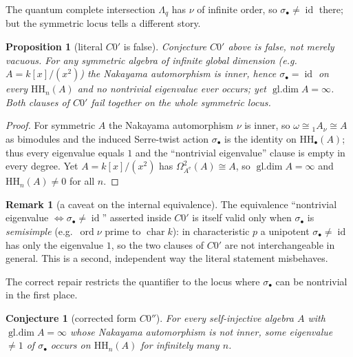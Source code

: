 \documentclass[11pt]{amsart}
\newtheorem{proposition}[theorem]{Proposition}
\newtheorem{conjecture}[theorem]{Conjecture}
\theoremstyle{definition}
\newtheorem{remark}[theorem]{Remark}
\newcommand{\HH}{\mathrm{HH}}
\newcommand{\gl}{\operatorname{gl.dim}}
\newcommand{\id}{\operatorname{id}}
\newcommand{\Ae}{A^{\mathrm{e}}}
\newcommand{\kk}{k}
\begin{document}
The quantum complete intersection $\Lambda_q$ has $\nu$ of infinite order, so
$\sigma_\bullet\ne\id$ there; but the symmetric locus tells a different story.

\begin{proposition}[literal $C0'$ is false]\label{prop:c0false}
Conjecture $C0'$ above is \emph{false}, not merely vacuous. For any
\emph{symmetric} algebra of infinite global dimension (e.g.\
$A=\kk[x]/(x^2)$) the Nakayama automorphism is inner, hence
$\sigma_\bullet=\id$ on every $\HH_n(A)$ and no nontrivial eigenvalue ever
occurs; yet $\gl A=\infty$. Both clauses of $C0'$ fail together on the whole
symmetric locus.
\end{proposition}

\begin{proof}
For symmetric $A$ the Nakayama automorphism $\nu$ is inner, so $\omega\cong{}_1A_\nu\cong A$
as bimodules and the induced Serre-twist action $\sigma_\bullet$ is the identity
on $\HH_\bullet(A)$; thus every eigenvalue equals $1$ and the ``nontrivial
eigenvalue'' clause is empty in every degree. Yet $A=\kk[x]/(x^2)$ has
$\Omega^2_{\Ae}(A)\cong A$, so $\gl A=\infty$ and $\HH_n(A)\ne0$ for all $n$.
\end{proof}

\begin{remark}[a caveat on the internal equivalence]\label{rem:c0equiv}
The equivalence ``nontrivial eigenvalue $\iff\sigma_\bullet\ne\id$'' asserted
inside $C0'$ is itself valid only when $\sigma_\bullet$ is \emph{semisimple}
(e.g.\ $\operatorname{ord}\nu$ prime to $\operatorname{char}\kk$): in
characteristic $p$ a unipotent $\sigma_\bullet\ne\id$ has only the eigenvalue
$1$, so the two clauses of $C0'$ are not interchangeable in general. This is a
second, independent way the literal statement misbehaves.
\end{remark}

The correct repair restricts the quantifier to the locus where $\sigma_\bullet$
can be nontrivial in the first place.

\begin{conjecture}[corrected form $C0''$]\label{conj:C0prime}
For every self-injective algebra $A$ with $\gl A=\infty$ whose Nakayama
automorphism is \emph{not inner}, some eigenvalue $\ne1$ of $\sigma_\bullet$
occurs on $\HH_n(A)$ for infinitely many $n$.
\end{conjecture}
\end{document}

